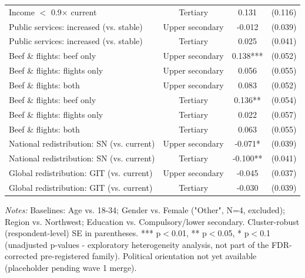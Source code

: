 \begin{table}[H]
\begin{tabular}{ l c c c }
\hspace{0.05cm} Income $<$ 0.9$\times$ current & Tertiary & 0.131 & (0.116) \\
\hspace{0.05cm} Public services: increased (vs. stable) & Upper secondary & -0.012 & (0.039) \\
\hspace{0.05cm} Public services: increased (vs. stable) & Tertiary & 0.025 & (0.041) \\
\hspace{0.05cm} Beef \& flights: beef only & Upper secondary & 0.138*** & (0.052) \\
\hspace{0.05cm} Beef \& flights: flights only & Upper secondary & 0.056 & (0.055) \\
\hspace{0.05cm} Beef \& flights: both & Upper secondary & 0.083 & (0.052) \\
\hspace{0.05cm} Beef \& flights: beef only & Tertiary & 0.136** & (0.054) \\
\hspace{0.05cm} Beef \& flights: flights only & Tertiary & 0.022 & (0.057) \\
\hspace{0.05cm} Beef \& flights: both & Tertiary & 0.063 & (0.055) \\
\hspace{0.05cm} National redistribution: SN (vs. current) & Upper secondary & -0.071* & (0.039) \\
\hspace{0.05cm} National redistribution: SN (vs. current) & Tertiary & -0.100** & (0.041) \\
\hspace{0.05cm} Global redistribution: GIT (vs. current) & Upper secondary & -0.045 & (0.037) \\
\hspace{0.05cm} Global redistribution: GIT (vs. current) & Tertiary & -0.030 & (0.039) \\
\hline \hline
\end{tabular}
\begin{tablenotes}
\small
\item \textit{Notes:} Baselines: Age vs. 18-34; Gender vs. Female ("Other", N=4, excluded); Region vs. Northwest; Education vs. Compulsory/lower secondary. Cluster-robust (respondent-level) SE in parentheses. *** p$<$0.01, ** p$<$0.05, * p$<$0.1 (unadjusted p-values - exploratory heterogeneity analysis, not part of the FDR-corrected pre-registered family). Political orientation not yet available (placeholder pending wave 1 merge).
\end{tablenotes}
    \label{tab:results_heterogeneity_secondary}
\end{table}
